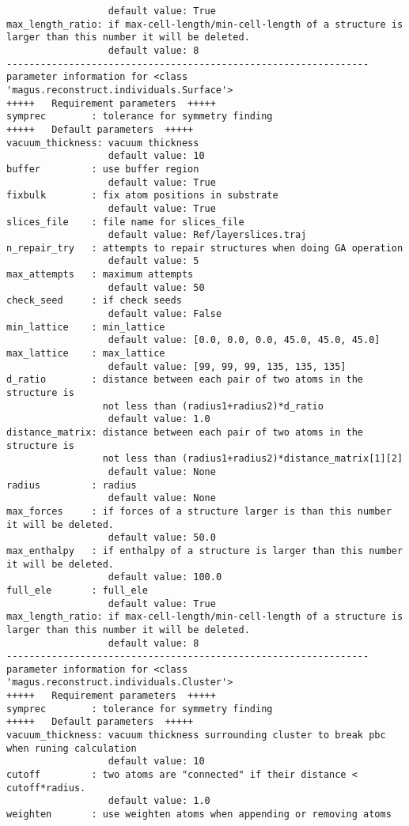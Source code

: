 \documentclass[12pt,oneside]{book}
\begin{document}
\begin{tcolorbox}
\begin{verbatim}
                  default value: True
max_length_ratio: if max-cell-length/min-cell-length of a structure is larger than this number it will be deleted.
                  default value: 8
----------------------------------------------------------------
parameter information for <class 'magus.reconstruct.individuals.Surface'>
+++++	Requirement parameters	+++++
symprec        : tolerance for symmetry finding
+++++	Default parameters	+++++
vacuum_thickness: vacuum thickness
                  default value: 10
buffer         : use buffer region
                  default value: True
fixbulk        : fix atom positions in substrate
                  default value: True
slices_file    : file name for slices_file
                  default value: Ref/layerslices.traj
n_repair_try   : attempts to repair structures when doing GA operation
                  default value: 5
max_attempts   : maximum attempts
                  default value: 50
check_seed     : if check seeds
                  default value: False
min_lattice    : min_lattice
                  default value: [0.0, 0.0, 0.0, 45.0, 45.0, 45.0]
max_lattice    : max_lattice
                  default value: [99, 99, 99, 135, 135, 135]
d_ratio        : distance between each pair of two atoms in the structure is
                 not less than (radius1+radius2)*d_ratio
                  default value: 1.0
distance_matrix: distance between each pair of two atoms in the structure is
                 not less than (radius1+radius2)*distance_matrix[1][2]
                  default value: None
radius         : radius
                  default value: None
max_forces     : if forces of a structure larger is than this number it will be deleted.
                  default value: 50.0
max_enthalpy   : if enthalpy of a structure is larger than this number it will be deleted.
                  default value: 100.0
full_ele       : full_ele
                  default value: True
max_length_ratio: if max-cell-length/min-cell-length of a structure is larger than this number it will be deleted.
                  default value: 8
----------------------------------------------------------------
parameter information for <class 'magus.reconstruct.individuals.Cluster'>
+++++	Requirement parameters	+++++
symprec        : tolerance for symmetry finding
+++++	Default parameters	+++++
vacuum_thickness: vacuum thickness surrounding cluster to break pbc when runing calculation
                  default value: 10
cutoff         : two atoms are "connected" if their distance < cutoff*radius.
                  default value: 1.0
weighten       : use weighten atoms when appending or removing atoms

\end{verbatim}
\end{tcolorbox}
\end{document}
